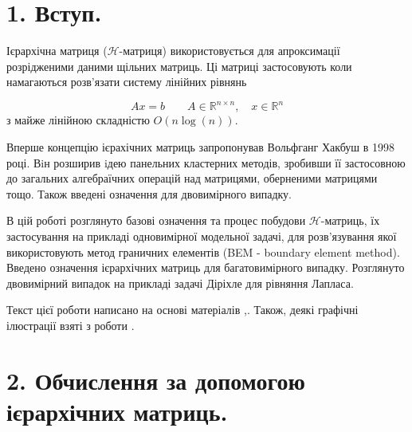 \documentclass[12pt]{report}
\begin{document}
\chapter{1. Вступ.}
	\hspace{0.8cm} Ієрархічна матриця ($\mathcal{H}$-матриця) використовується для апроксимації розрідженими даними щільних матриць. Ці матриці застосовують коли намагаються розв'язати систему лінійних рівнянь
	
	 $$ Ax=b \quad\quad  A \in \mathbb{R}^{n\times n} ,\quad   x\in \mathbb{R}^n$$ \newline
	 з майже лінійною складністю $O(n\log(n))$.
	 \par Вперше концепцію ієрахічних матриць запропонував Вольфганг Хакбуш  в 1998 році. Вiн розширив iдею панельних кластерних методів, зробивши її застосовною до загальних алгебраїчних операцій над матрицями, оберненими матрицями тощо. Також введені означення для двовимірного випадку.  
	 \par В цій роботі розглянуто базові означення та процес побудови $\mathcal{H}$-матриць, їх застосування на прикладі одновимірної модельної задачі, для розв'язування якої використовують метод граничних елементів (BEM - boundary element method). Введено означення ієрархічних матриць для  багатовимірного випадку. Розглянуто двовимірний випадок на прикладі задачі Діріхле для рівняння Лапласа.
	 \par Текст цієї роботи написано на основі матеріалів \cite{HM},\cite{Diss}. Також, деякі графічні ілюстрації взяті з роботи \cite{HM}.
	 
	
\newpage
\chapter{2. Обчислення за допомогою ієрархічних матриць.}
\end{document}
